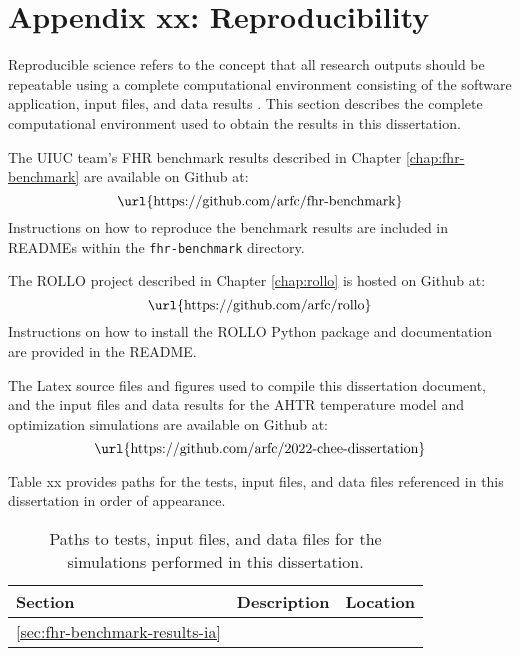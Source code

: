 \chapter{Appendix xx: Reproducibility} 

Reproducible science refers to the concept that all research outputs should be 
repeatable using a complete computational environment consisting of the software 
application, input files, and data results \cite{novak_multiscale_2020}.
This section describes the complete computational environment used to obtain the 
results in this dissertation.

The UIUC team's \gls{FHR} benchmark results described in Chapter \ref{chap:fhr-benchmark} 
are available on Github at: 
\begin{equation*}
\mbox{\url{https://github.com/arfc/fhr-benchmark}}
\end{equation*}
Instructions on how to reproduce the benchmark results are included in READMEs within 
the \texttt{fhr-benchmark} directory. 

The \gls{ROLLO} project described in Chapter \ref{chap:rollo} is hosted on Github at: 
\begin{equation*}
    \mbox{\url{https://github.com/arfc/rollo}}
\end{equation*}
Instructions on how to install the \gls{ROLLO} Python package and documentation are 
provided in the README. 

The Latex source files and figures used to compile this dissertation document, and 
the input files and data results for the AHTR temperature model and optimization 
simulations are available on Github at:  
\begin{equation*}
    \mbox{\url{https://github.com/arfc/2022-chee-dissertation}}
\end{equation*}

Table xx provides paths for the tests, input files, and data files referenced in this 
dissertation in order of appearance. 

\begin{landscape}
\begin{table}[htbp!]
    \centering
    \onehalfspacing
    \caption{Paths to tests, input files, and data files for the simulations performed 
    in this dissertation. }
    \label{tab:reproducibility}
    \footnotesize
    \begin{tabular}{lll}
    \hline 
    \textbf{Section} & \textbf{Description} & \textbf{Location} \\
    \hline
    \ref{sec:fhr-benchmark-results-ia} & & \\ 
    \hline
    \end{tabular}
\end{table}
\end{landscape}